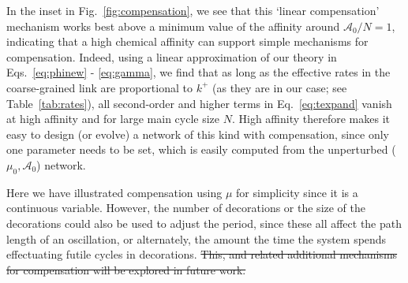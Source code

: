 \documentclass[amsmath, preprintnumbers, 10pt, twocolumn, pre, bibliograpy]{revtex4-1}
\newcommand{\aff}{\mathcal A}
\providecommand{\DIFdel}[1]{{\protect\color{red}\sout{#1}}}                      %
\providecommand{\DIFdelbegin}{} %
\providecommand{\DIFdelend}{} %
\newcommand{\DIFscaledelfig}{0.5}
\newlength{\DIFdelgraphicswidth} %
\newlength{\DIFdelgraphicsheight} %
\newcommand{\DIFdelincludegraphics}[2][]{%
\sbox{\DIFdelgraphicsbox}{\DIFOincludegraphics[#1]{#2}}%
\settoboxwidth{\DIFdelgraphicswidth}{\DIFdelgraphicsbox} %
\settoboxtotalheight{\DIFdelgraphicsheight}{\DIFdelgraphicsbox} %
\scalebox{\DIFscaledelfig}{%
\parbox[b]{\DIFdelgraphicswidth}{\usebox{\DIFdelgraphicsbox}\\[-\baselineskip] \rule{\DIFdelgraphicswidth}{0em}}\llap{\resizebox{\DIFdelgraphicswidth}{\DIFdelgraphicsheight}{%
\setlength{\unitlength}{\DIFdelgraphicswidth}%
\begin{picture}(1,1)%
\thicklines\linethickness{2pt} %
{\color[rgb]{1,0,0}\put(0,0){\framebox(1,1){}}}%
{\color[rgb]{1,0,0}\put(0,0){\line( 1,1){1}}}%
{\color[rgb]{1,0,0}\put(0,1){\line(1,-1){1}}}%
\end{picture}%
}\hspace*{3pt}}} %
} %
\DeclareRobustCommand{\DIFdelbegin}{\DIFOdelbegin \let\includegraphics\DIFdelincludegraphics} %
\DeclareRobustCommand{\DIFdelend}{\DIFOaddend \let\includegraphics\DIFOincludegraphics} %
\begin{document}
In the inset in Fig.~\ref{fig:compensation}, we see that this `linear compensation' mechanism works best above a minimum value of the affinity around $\aff_0/N = 1$, indicating that a high chemical affinity can support simple mechanisms for compensation.
Indeed, using a linear approximation of our theory in Eqs.~\ref{eq:phinew} - \ref{eq:gamma}, we find that as long as the effective rates in the coarse-grained link are proportional to $k^+$ (as they are in our case; see Table~\ref{tab:rates}), all second-order and higher terms in Eq.~\ref{eq:texpand} vanish at high affinity and for large main cycle size $N$. High affinity therefore makes it easy to design (or evolve) a network of this kind with compensation, since only one parameter needs to be set, which is easily computed from the unperturbed ($\mu_0, \aff_0$) network.

Here we have illustrated compensation using $\mu$ for simplicity since it is a continuous variable. However, the number of decorations or the size of the decorations could also be used to adjust the period, since these all affect the path length of an oscillation, or alternately, the amount the time the system spends effectuating futile cycles in decorations. \DIFdelbegin \DIFdel{This, and related additional mechanisms for compensation will be explored in future work.
}\DIFdelend %
\end{document}
